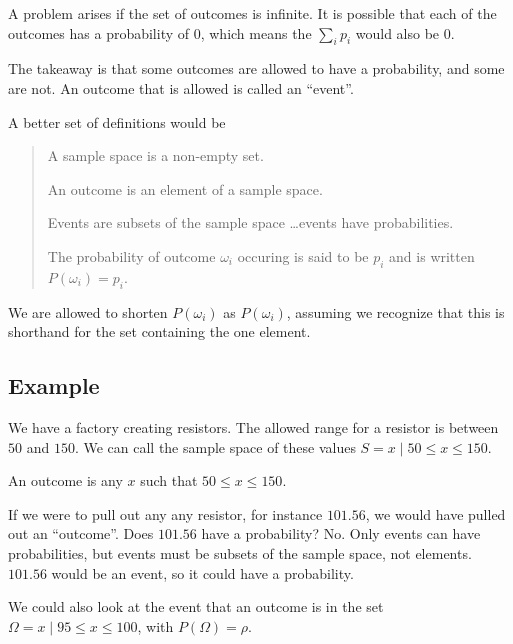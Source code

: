 \documentclass{article}
\begin{document}
A problem arises if the set of outcomes is infinite. It is possible
that each of the outcomes has a probability of $0$, which means the
$\sum_i p_i$ would also be $0$.

The takeaway is that some outcomes are allowed to have a probability,
and some are not. An outcome that is allowed is called an ``event''.

A better set of definitions would be

\begin{quote}
A sample space is a non-empty set.

An outcome is an element of a sample space.

Events are subsets of the sample space \ldots events have
probabilities.

The probability of outcome $\omega_i$ occuring is said to be $p_i$ and
is written $P({\omega_i})=p_i$.
\end{quote}

We are allowed to shorten $P({\omega_i})$ as $P(\omega_i)$, assuming
we recognize that this is shorthand for the set containing the one
element.

\subsection*{Example}

We have a factory creating resistors. The allowed range for a resistor
is between $50$ and $150$. We can call the sample space of these
values $S={x\mid 50\le x\le 150}$.

An outcome is any $x$ such that $50\le x \le 150$.

If we were to pull out any any resistor, for instance $101.56$, we
would have pulled out an ``outcome''. Does $101.56$ have a
probability? No. Only events can have probabilities, but events must
be subsets of the sample space, not elements. ${101.56}$ would be an
event, so it could have a probability.

We could also look at the event that an outcome is in the set
$\Omega={x\mid 95\le x\le 100}$, with $P(\Omega)=\rho$.
\end{document}
